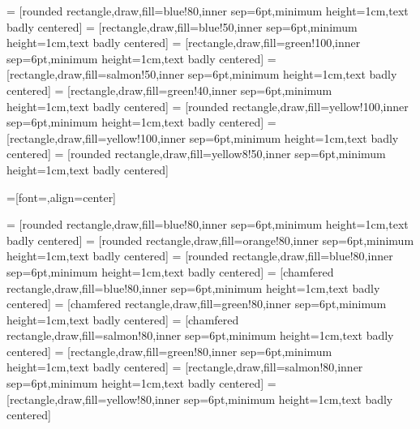  = [rounded rectangle,draw,fill=blue!80,inner sep=6pt,minimum height=1cm,text badly centered]
 = [rectangle,draw,fill=blue!50,inner sep=6pt,minimum height=1cm,text badly centered]
 = [rectangle,draw,fill=green!100,inner sep=6pt,minimum height=1cm,text badly centered]
 = [rectangle,draw,fill=salmon!50,inner sep=6pt,minimum height=1cm,text badly centered]
 = [rectangle,draw,fill=green!40,inner sep=6pt,minimum height=1cm,text badly centered]
 = [rounded rectangle,draw,fill=yellow!100,inner sep=6pt,minimum height=1cm,text badly centered]
 = [rectangle,draw,fill=yellow!100,inner sep=6pt,minimum height=1cm,text badly centered]
 = [rounded rectangle,draw,fill=yellow8!50,inner sep=6pt,minimum height=1cm,text badly centered]

=[font=\sffamily,align=center]

\newcommand{\fillOpacity}{80}

\newcommand{\compShape}{rectangle}
\newcommand{\groupShape}{chamfered rectangle}
\newcommand{\procShape}{rounded rectangle}

\newcommand{\explicitColor}{green}
\newcommand{\implicitColor}{salmon}
\newcommand{\optimizationColor}{blue} %

 = [\procShape,draw,fill=\optimizationColor!\fillOpacity,inner sep=6pt,minimum height=1cm,text badly centered]
 = [\procShape,draw,fill=orange!\fillOpacity,inner sep=6pt,minimum height=1cm,text badly centered]
 = [\procShape,draw,fill=\optimizationColor!\fillOpacity,inner sep=6pt,minimum height=1cm,text badly centered]
 = [\groupShape,draw,fill=\optimizationColor!\fillOpacity,inner sep=6pt,minimum height=1cm,text badly centered]
 = [\groupShape,draw,fill=\explicitColor!\fillOpacity,inner sep=6pt,minimum height=1cm,text badly centered]
 = [\groupShape,draw,fill=\implicitColor!\fillOpacity,inner sep=6pt,minimum height=1cm,text badly centered]
 = [\compShape,draw,fill=\explicitColor!\fillOpacity,inner sep=6pt,minimum height=1cm,text badly centered]
 = [\compShape,draw,fill=\implicitColor!\fillOpacity,inner sep=6pt,minimum height=1cm,text badly centered]
 = [\compShape,draw,fill=yellow!\fillOpacity,inner sep=6pt,minimum height=1cm,text badly centered]

